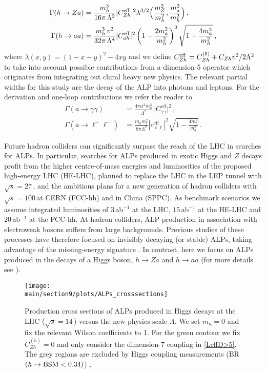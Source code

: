 \begin{align}
\Gamma(h \to Za)&=\frac{m_h^3}{16\pi\,\Lambda^2}|C_{Zh}^\text{eff}|^2\lambda^{3/2}\Big(\frac{m_Z^2}{m_h^2},\frac{m_a^2}{m_h^2}\Big)\,,\\
\Gamma(h \to aa)&=\frac{m_h^3\,v^2}{32\pi\,\Lambda^4}|C_{ah}^{\rm eff}|^2\left(1-\frac{2m_a^2}{m_h^2}\right)^2\sqrt{1-\frac{4m_a^2}{m_h^2}}\,,
\end{align}
%
where $\lambda(x,y)=(1-x-y)^2-4xy$ and we define $C_{Zh}^{\rm eff} = C_{Zh}^{(5)} + C_{Zh} v^2/2 \Lambda^2$ to take into account possible contributions from a dimension-5 operator which originates from integrating out chiral heavy new physics. The relevant partial widths for this study are the decay of the ALP into photons and leptons. For the derivation and one-loop contributions we refer the reader to \cite{Bauer:2017ris}
%
\begin{align}
 \Gamma(a\to\gamma\gamma)  &= \frac{4\pi\alpha^2 m_a^3}{\Lambda^2}\,\big| C_{\gamma\gamma}^\text{eff} \big|^2 \,, \\
 \Gamma(a\to \ell^+ \ell^-)&=\frac{m_a m_\ell^2}{8\pi\Lambda^2} \left| c_{\ell\ell}^\text{eff}\right|^2 \sqrt{1-\frac{4m_\ell^2}{m_a^2}}\,.
\end{align}
%


Future hadron colliders can significantly surpass the reach of the LHC in searches for ALPs. In particular, searches for ALPs produced in exotic Higgs and $Z$ decays profit from the higher centre-of-mass energies and luminosities of the proposed high-energy LHC (HE-LHC), planned to replace the LHC in the LEP tunnel with $\sqrt{s}=27 \,$\UTeV, and the ambitious plans for a new generation of hadron colliders with $\sqrt{s}=100\,$\UTeV at CERN (FCC-hh) and in China (SPPC). As benchmark scenarios we assume integrated luminosities of $3$\,ab$^{-1}$ at the LHC, $15$\,ab$^{-1}$ at the HE-LHC and $20$\,ab$^{-1}$ at the FCC-hh.
At hadron colliders, ALP production in association with electroweak bosons suffers from large backgrounds. Previous studies of these processes have therefore focused on invisibly decaying (or stable) ALPs, taking advantage of the missing-energy signature \cite{Mimasu:2014nea,Brivio:2017ije}. In contrast, here we focus on ALPs produced in the decays of a Higgs boson, $h\to Za$ and $h \to a a$ (for more details see \cite{Bauer:2018uxu}).


%
\begin{figure}
\begin{center}
\texttt{[image: \\main/section9/plots/ALPs\_crosssections]}
    \end{center}
\caption{\label{fig:ALPpsec} Production cross sections of ALPs produced in Higgs decays at the LHC ($\sqrt{s} = 14\,$\UTeV) versus the new-physics scale $\Lambda$. We set $m_a=0$ and fix the relevant Wilson coefficients to 1. For the green contour we fix $C_{Zh}^{(5)}=0$ and only consider the dimension-7 coupling in \eqref{LeffD>5}.
The grey regions are excluded by Higgs coupling measurements (BR$(h\to{\rm{BSM}}<0.34)$) \cite{Khachatryan:2016vau}.}
\end{figure}
%

